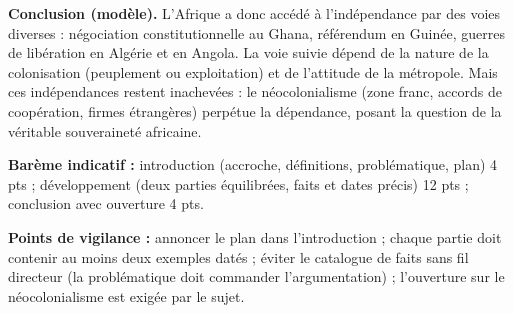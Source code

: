 \documentclass[11pt]{article}
\begin{document}
\begin{corrige}
\textbf{Conclusion (modèle).} L'Afrique a donc accédé à l'indépendance par des voies diverses : négociation constitutionnelle au Ghana, référendum en Guinée, guerres de libération en Algérie et en Angola. La voie suivie dépend de la nature de la colonisation (peuplement ou exploitation) et de l'attitude de la métropole. Mais ces indépendances restent inachevées : le néocolonialisme (zone franc, accords de coopération, firmes étrangères) perpétue la dépendance, posant la question de la véritable souveraineté africaine.

\textbf{Barème indicatif :} introduction (accroche, définitions, problématique, plan) 4 pts ; développement (deux parties équilibrées, faits et dates précis) 12 pts ; conclusion avec ouverture 4 pts.

\textbf{Points de vigilance :} annoncer le plan dans l'introduction ; chaque partie doit contenir au moins deux exemples datés ; éviter le catalogue de faits sans fil directeur (la problématique doit commander l'argumentation) ; l'ouverture sur le néocolonialisme est exigée par le sujet.
\end{corrige}
\end{document}
